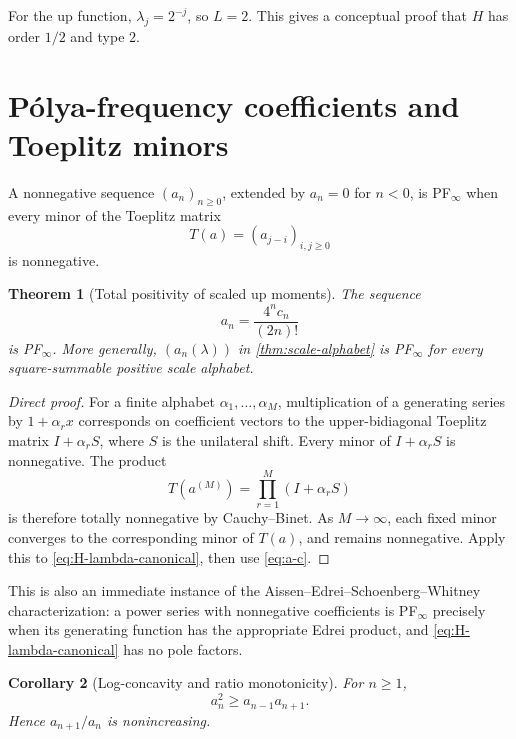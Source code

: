 \documentclass[11pt]{article}
\numberwithin{equation}{section}
\newtheorem{theorem}{Theorem}[section]
\newtheorem{corollary}[theorem]{Corollary}
\theoremstyle{definition}
\theoremstyle{remark}
\begin{document}
For the up function, $\lambda_j=2^{-j}$, so $L=2$.  This gives a conceptual proof that $H$ has order $1/2$ and type $2$.

\section{Pólya-frequency coefficients and Toeplitz minors}\label{sec:PF}

A nonnegative sequence $(a_n)_{n\ge0}$, extended by $a_n=0$ for $n<0$, is PF$_\infty$ when every minor of the Toeplitz matrix
\begin{equation}\label{eq:toeplitz}
 T(a)=(a_{j-i})_{i,j\ge0}
\end{equation}
is nonnegative.

\begin{theorem}[Total positivity of scaled up moments]\label{thm:PF}
The sequence
\begin{equation}\label{eq:PF-sequence}
 a_n=\frac{4^n c_n}{(2n)!}
\end{equation}
is PF$_\infty$.  More generally, $(a_n(\lambda))$ in \cref{thm:scale-alphabet} is PF$_\infty$ for every square-summable positive scale alphabet.
\end{theorem}
\begin{proof}[Direct proof]
For a finite alphabet $\alpha_1,\ldots,\alpha_M$, multiplication of a generating series by $1+\alpha_r x$ corresponds on coefficient vectors to the upper-bidiagonal Toeplitz matrix $I+\alpha_r S$, where $S$ is the unilateral shift.  Every minor of $I+\alpha_rS$ is nonnegative.  The product
\[
 T(a^{(M)})=\prod_{r=1}^{M}(I+\alpha_rS)
\]
is therefore totally nonnegative by Cauchy--Binet.  As $M\to\infty$, each fixed minor converges to the corresponding minor of $T(a)$, and remains nonnegative.  Apply this to \eqref{eq:H-lambda-canonical}, then use \eqref{eq:a-c}.
\end{proof}

This is also an immediate instance of the Aissen--Edrei--Schoenberg--Whitney characterization: a power series with nonnegative coefficients is PF$_\infty$ precisely when its generating function has the appropriate Edrei product, and \eqref{eq:H-lambda-canonical} has no pole factors.

\begin{corollary}[Log-concavity and ratio monotonicity]\label{cor:logconcave-a}
For $n\ge1$,
\begin{equation}\label{eq:a-logconcave}
 a_n^2\ge a_{n-1}a_{n+1}.
\end{equation}
Hence $a_{n+1}/a_n$ is nonincreasing.
\end{corollary}
\end{document}
